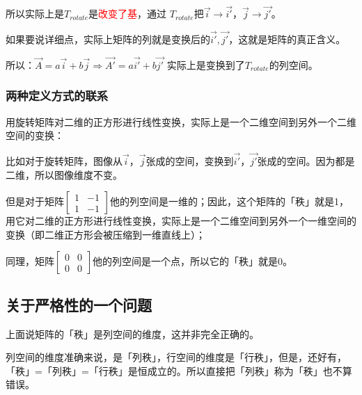 \documentclass[12pt]{article}
\begin{document}
所以实际上是$T_{rotate}$是\textcolor{red}{改变了基}，通过 $T_{rotate}$把$\vec{i} \rightarrow \vec{i'}$，$\vec{j} \rightarrow \vec{j'}$。

如果要说详细点，实际上矩阵的列就是变换后的$\vec{i'},\vec{j'}$，这就是矩阵的真正含义。

所以：$\vec{A} = a\vec{i} + b\vec{j} \Rightarrow \vec{A'} = a\vec{i'} + b\vec{j'}$ 实际上是变换到了$T_{rotate}$的列空间。

\subsubsection{两种定义方式的联系}
用旋转矩阵对二维的正方形进行线性变换，实际上是一个二维空间到另外一个二维空间的变换：

比如对于旋转矩阵，图像从$\vec{i}$，$\vec{j}$张成的空间，变换到$\vec{i'}$，$\vec{j'}$张成的空间。因为都是二维，所以图像维度不变。

但是对于矩阵$\begin{bmatrix}1&-1\\1&-1\end{bmatrix}$他的列空间是一维的；因此，这个矩阵的「秩」就是1，用它对二维的正方形进行线性变换，实际上是一个二维空间到另外一个一维空间的变换（即二维正方形会被压缩到一维直线上）；

同理，矩阵$\begin{bmatrix}0&0\\0&0\end{bmatrix}$他的列空间是一个点，所以它的「秩」就是0。

\subsection{关于严格性的一个问题}
上面说矩阵的「秩」是列空间的维度，这并非完全正确的。

列空间的维度准确来说，是「列秩」，行空间的维度是「行秩」，但是，还好有，「秩」=「列秩」=「行秩」是恒成立的。所以直接把「列秩」称为「秩」也不算错误。
\end{document}
